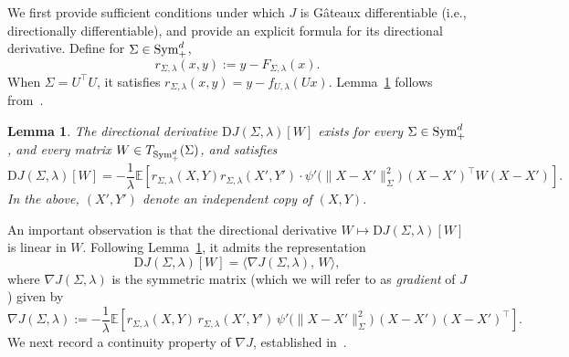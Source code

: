 \documentclass[sn-mathphys-num]{sn-jnl}%
\numberwithin{equation}{section}
\newcommand{\E}{\mathbb{E}}
\newtheorem{lemma}{Lemma}
\newcommand{\Sym}{{\rm \mathrm{Sym}}}
\theoremstyle{thmstyleone}%
\theoremstyle{thmstyletwo}%
\theoremstyle{thmstylethree}%
\begin{document}
We first provide sufficient conditions under which $J$ is G\^ateaux differentiable (i.e., directionally differentiable), and 
provide an explicit formula for its directional derivative. Define for $\Sigma \in \Sym_+^d$,
\begin{equation*}
	r_{\Sigma,\lambda}(x,y) := y - F_{\Sigma,\lambda}(x).
\end{equation*}
When $\Sigma = U^\top U$, it satisfies $r_{\Sigma,\lambda}(x,y) = y - f_{U,\lambda}(Ux)$.
Lemma~\ref{theorem:first-variation-formula} follows from~\cite[Theorem 4.2]{LiRu25}. 




\vspace{.5em} 
\begin{lemma}
\label{theorem:first-variation-formula}
The directional derivative $\mathrm{D} J(\Sigma, \lambda)[W]$ exists 
for every $\Sigma \in \Sym_+^d$, and every matrix $W \in T_{\Sym_+^d}(\Sigma)$, and satisfies 
\begin{equation}
\label{eqn:first-variation-formula}
	\mathrm{D} J(\Sigma, \lambda)[W] =
		- \frac{1}{\lambda} \E \left[r_{\Sigma, \lambda}(X, Y) r_{\Sigma, \lambda}(X', Y') \cdot \psi'\!\bigl(\|X - X'\|_\Sigma^2\bigr)\,(X - X')^\top W (X - X')\right].
\end{equation}
In the above, $(X', Y')$ denote an independent copy of $(X, Y)$. 
\end{lemma} 

\vspace{.5em} 
An important observation is that the directional 
derivative $W \mapsto \mathrm{D} J(\Sigma, \lambda)[W]$ is linear in $W$. Following Lemma~\ref{theorem:first-variation-formula},
it admits the representation
\begin{equation*}
	\mathrm{D}J(\Sigma,\lambda)[W]
	= \bigl\langle \nabla J(\Sigma,\lambda),\, W \bigr\rangle,
\end{equation*}
where $\nabla J(\Sigma,\lambda)$ is the symmetric matrix (which we will refer to as \emph{gradient} of $J$) given by
\begin{equation}
\label{eqn:gradient-of-J}
	\nabla J(\Sigma,\lambda)
	:=
	- \frac{1}{\lambda}
	\E\!\left[
		r_{\Sigma,\lambda}(X,Y)\, r_{\Sigma,\lambda}(X',Y')\,
		\psi'\!\bigl(\|X - X'\|_\Sigma^2\bigr)\,
		(X - X')(X - X')^\top
	\right].
\end{equation}
We next record a continuity property of $\nabla J$, established in~\cite[Corollary 4.10]{LiRu25}. 
\end{document}
